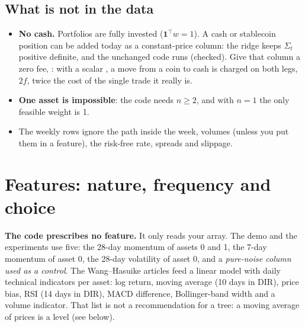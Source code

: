 \documentclass[11pt,a4paper]{article}
\newcommand{\1}{\mathbf{1}}
\newcommand{\code}[1]{\texttt{\detokenize{#1}}}
\begin{document}
\subsection{What is not in the data}
\begin{itemize}
\item \textbf{No cash.} Portfolios are fully invested ($\1^\top w=1$). A cash or stablecoin position can be added today as a constant-price column: the ridge keeps $\Sigma_t$ positive definite, and the unchanged code runs (checked). Give that column a zero fee, \code{fee_rate=(f, f, 0)}: with a scalar \code{fee_rate}, a move from a coin to cash is charged on both legs, $2f$, twice the cost of the single trade it really is.
\item \textbf{One asset is impossible}: the code needs $n\ge 2$, and with $n=1$ the only feasible weight is 1.
\item The weekly rows ignore the path inside the week, volumes (unless you put them in a feature), the risk-free rate, spreads and slippage.
\end{itemize}

\section{Features: nature, frequency and choice}\label{sec:features}

\textbf{The code prescribes no feature.} It only reads your array. The demo and the experiments use five: the 28-day momentum of assets 0 and 1, the 7-day momentum of asset 0, the 28-day volatility of asset 0, and a \emph{pure-noise column used as a control}. The Wang--Hasuike articles feed a linear model with daily technical indicators per asset: log return, moving average (10 days in DIR), price bias, RSI (14 days in DIR), MACD difference, Bollinger-band width and a volume indicator. That list is not a recommendation for a tree: a moving average of prices is a level (see below).
\end{document}
